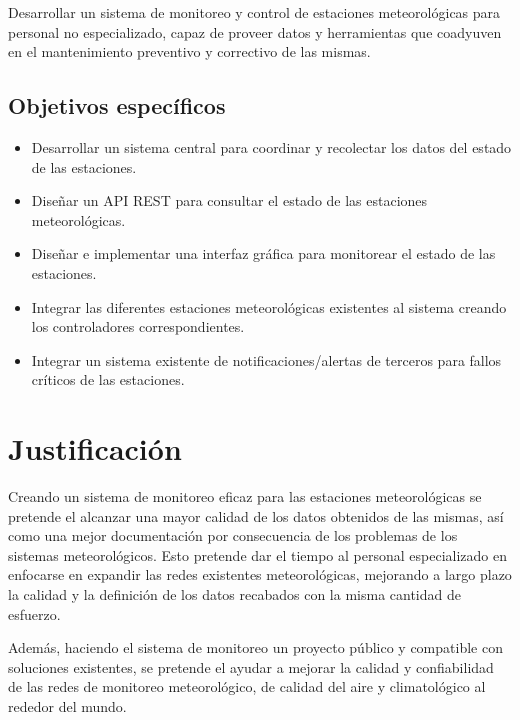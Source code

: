 Desarrollar un sistema de monitoreo y control de estaciones meteorológicas para personal no especializado, capaz de proveer datos y herramientas que coadyuven en el mantenimiento preventivo y correctivo de las mismas.

\subsection{Objetivos específicos}

\begin{itemize}
   \item Desarrollar un sistema central para coordinar y recolectar los datos del estado de las estaciones.

   \item Diseñar un API REST para consultar el estado de las estaciones meteorológicas.


   \item Diseñar e implementar una interfaz gráfica para monitorear el estado de las estaciones.

   \item Integrar las diferentes estaciones meteorológicas existentes al sistema creando los controladores correspondientes.

   \item Integrar un sistema existente de notificaciones/alertas de terceros para fallos críticos de las estaciones.
\end{itemize}

\section{Justificación}

Creando un sistema de monitoreo eficaz para las estaciones meteorológicas se pretende el alcanzar una mayor calidad de los datos obtenidos de las mismas, así como una mejor documentación por consecuencia de los problemas de los sistemas meteorológicos. Esto pretende dar el tiempo al personal especializado en enfocarse en expandir las redes existentes meteorológicas, mejorando a largo plazo la calidad y la definición de los datos recabados con la misma cantidad de esfuerzo.

Además, haciendo el sistema de monitoreo un proyecto público y compatible con soluciones existentes, se pretende el ayudar a mejorar la calidad y confiabilidad de las redes de monitoreo meteorológico, de calidad del aire y climatológico al rededor del mundo.

